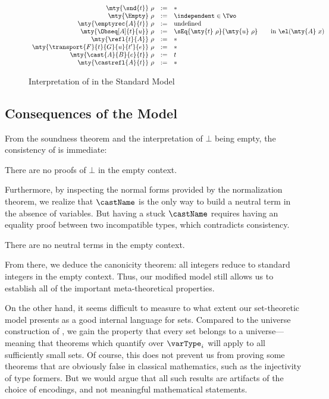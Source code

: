 \begin{figure}
\begin{small}
\[\begin{array}{rcl}
  \mty{\snd{t}}\ \rho & := & * \\
  \mty{\Empty}\ \rho & := & \independent \in \Two \\
  \mty{\emptyrec{A}{t}}\ \rho & := & \text{undefined} \\
  \mty{\Obseq[A]{t}{u}}\ \rho & := & \sEq{\mty{t}\ \rho}{\mty{u}\ \rho} \qquad\text{in }\el(\mty{A}\ x) \\
  \mty{\refl{t}{A}}\ \rho & := & * \\
  \mty{\transport{F}{t}{G}{u}{t'}{e}}\ \rho & := & * \\
  \mty{\cast{A}{B}{e}{t}}\ \rho & := & t\\
  \mty{\castrefl{A}{t}}\ \rho & := & *
\end{array}
\]
\end{small}
  \caption{Interpretation of \SetoidTT in the Standard Model}
  \label{fig:interpretation}
\end{figure}

\subsection{Consequences of the Model}

From the soundness theorem and the interpretation of \( \bot \) being empty,
the consistency of \SetoidCC is immediate:

\begin{theorem}[Consistency]
  There are no proofs of \( \bot \) in the empty context.
\end{theorem}

Furthermore, by inspecting the normal forms provided by the normalization
theorem, we realize that \( \castName \) is the only way to build a neutral
term in the absence of variables. But having a stuck \( \castName \) requires
having an equality proof between two incompatible types, which contradicts
consistency.

\begin{theorem}
  There are no neutral terms in the empty context.
\end{theorem}

From there, we deduce the canonicity theorem: all integers reduce to
standard integers in the empty context. Thus, our modified model still allows
us to establish all of the important meta-theoretical properties.

On the other hand, it seems difficult to measure to what extent our
set-theoretic model presents
\SetoidCC as a good internal language for sets. Compared to the universe
construction of , we gain the property that every set belongs
to a universe---meaning that theorems which quantify over \( \varType_i \)
will apply to all sufficiently small sets.
%
Of course, this does not prevent us from proving some theorems that are
obviously false in classical mathematics, such as the
injectivity of type formers. But we would argue that all such results
are artifacts of the choice of encodings, and not meaningful
mathematical statements.

